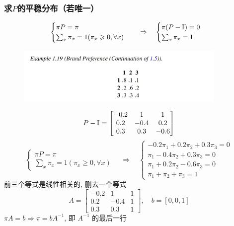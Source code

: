 \subsubsection{求$P$的平稳分布（若唯一）}
\[
\begin{cases}
    \pi P=\pi\\
    \sum_{x}\pi_x=1(\pi_x\geqslant 0,\forall x)
\end{cases}\quad \Rightarrow \quad
\begin{cases}
    \pi(P-\mathbb I)=0\\
    \sum_x\pi_x=1
\end{cases}
\]
\begin{example}[Durrett, 1.19]
    \begin{figure}[H]
        \centering
        \includegraphics[width=0.9\textwidth]{figures/1_19.png}
    \end{figure}
\end{example}
\[
P-\mathbb I=\begin{bmatrix}
    -0.2 & 1 & 1\\
    0.2 & -0.4 & 0.2\\
    0.3 & 0.3 & -0.6
\end{bmatrix}
\]
\[
\begin{cases}
    \pi P=\pi\\
    \sum_{x}\pi_x=1(\pi_x\geq 0,\forall x)
\end{cases}\quad \Rightarrow \quad
\begin{cases}
    -0.2\pi_1+0.2\pi_2+0.3\pi_3=0\\
    \pi_1-0.4\pi_2+0.3\pi_3=0\\
    \pi_1+0.2\pi_2-0.6\pi_3=0\\
    \pi_1+\pi_2+\pi_3=1
\end{cases}
\]
前三个等式是线性相关的, 删去一个等式
\[
A=\begin{bmatrix}
    -0.2 & 1 & 1\\
    0.2 & -0.4 & 1\\
    0.3 & 0.3 & 1
\end{bmatrix},\quad b=[0,0,1]
\]
$\pi A=b\Rightarrow \pi=bA^{-1}$, 即 $A^{-1}$ 的最后一行

\newpage
